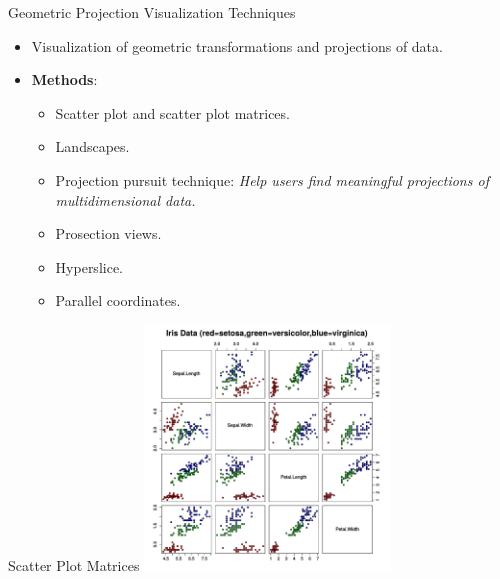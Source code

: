 \begin{frame}{Geometric Projection Visualization Techniques}
  \begin{itemize}
  \item Visualization of geometric transformations and projections of data.
  \item \textbf{Methods}:
    \begin{itemize}
    \item Scatter plot and scatter plot matrices.
    \item Landscapes.
    \item Projection pursuit technique: \emph{Help users find meaningful projections of multidimensional data.}
    \item Prosection views.
    \item Hyperslice.
    \item Parallel coordinates.
    \end{itemize}
  \end{itemize}
\end{frame}

\begin{frame}{Scatter Plot Matrices}
  \centering
  \includegraphics[height=6.5cm]{img/scatterplot_matrix.pdf}
\end{frame}

